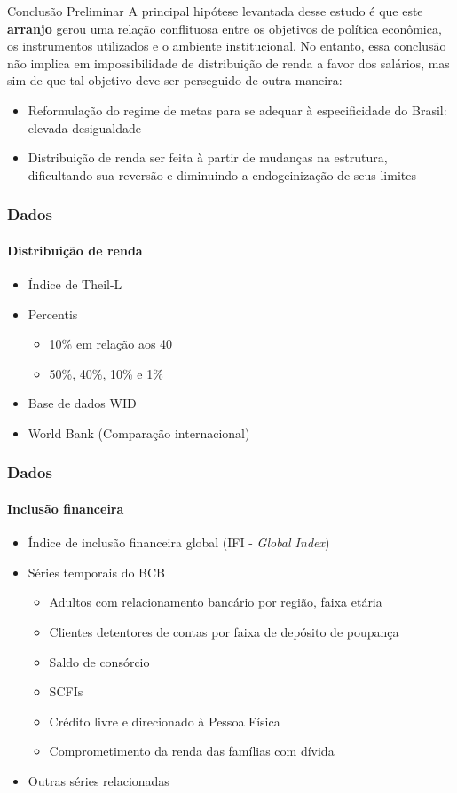 \documentclass[pdf, xcolor=table]{beamer}
\begin{document}
\begin{frame}{Conclusão Preliminar}
    A principal hipótese levantada desse estudo é que este \textbf{arranjo} gerou uma relação conflituosa entre os objetivos de política econômica, os instrumentos utilizados e o ambiente institucional. No entanto, essa conclusão não implica em impossibilidade de distribuição de renda a favor dos salários, mas sim de que tal objetivo deve ser perseguido de outra maneira:
    \begin{itemize}
        \item Reformulação do regime de metas para se adequar à especificidade do Brasil: elevada desigualdade
        \item Distribuição de renda ser feita à partir de mudanças na estrutura, dificultando sua reversão e diminuindo a endogeinização de seus limites
    \end{itemize}
\end{frame}

\begin{frame}
\frametitle{Dados}
\framesubtitle{Distribuição de renda}
    \begin{itemize}
        \item Índice de Theil-L
        \item Percentis
            \begin{itemize}
                \item 10\% em relação aos 40%
                \item 50\%, 40\%, 10\% e 1\%
            \end{itemize}
        \item Base de dados WID
        \item World Bank (Comparação internacional)
    \end{itemize}
\end{frame}


\begin{frame}
\frametitle{Dados}
\framesubtitle{Inclusão financeira}
    \begin{itemize}
        \item Índice de inclusão financeira global (IFI - \textit{Global Index})
        \item Séries temporais do BCB
        \begin{itemize}
            \item Adultos com relacionamento bancário por região, faixa etária
            \item Clientes detentores de contas por faixa de depósito de poupança
            \item Saldo de consórcio
            \item SCFIs
            \item Crédito livre e direcionado à Pessoa Física
            \item Comprometimento da renda das famílias com dívida
        \end{itemize}
        \item Outras séries relacionadas
    \end{itemize}
\end{frame}
\end{document}
